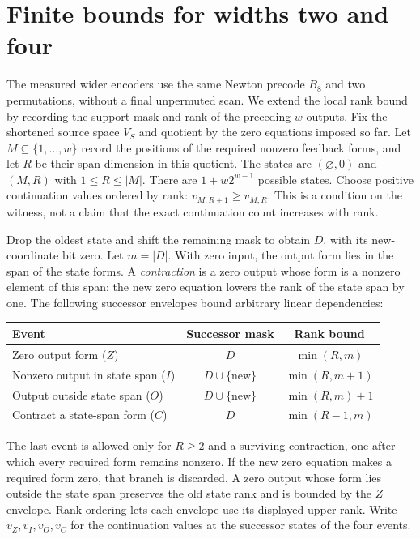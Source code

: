 \section{Finite bounds for widths two and four}\label{app:wide-mask}

The measured wider encoders use the same Newton precode $B_8$ and two
permutations, without a final unpermuted scan. We extend the local rank
bound by recording the support mask and rank of the preceding $w$ outputs.
Fix the shortened source space $V_S$ and quotient by the zero equations
imposed so far. Let $M\subseteq\{1,\ldots,w\}$ record the positions of the
required nonzero feedback forms, and let $R$ be their span dimension in
this quotient. The states are $(\varnothing,0)$ and
$(M,R)$ with $1\le R\le|M|$. There are $1+w2^{w-1}$ possible states.
Choose positive continuation values ordered by rank:
$v_{M,R+1}\ge v_{M,R}$. This is a condition on the witness, not a claim
that the exact continuation count increases with rank.

Drop the oldest state and shift the remaining mask to obtain $D$, with
its new-coordinate bit zero. Let $m=|D|$. With zero input, the output
form lies in the span of the state forms. A \emph{contraction} is a
zero output whose form is a nonzero element of this span: the new zero
equation lowers the rank of the state span by one. The following
successor envelopes bound arbitrary linear dependencies:
\begin{center}
\begin{tabular}{lcc}
\toprule
Event & Successor mask & Rank bound\\
\midrule
Zero output form ($Z$) & $D$ & $\min(R,m)$\\
Nonzero output in state span ($I$) & $D\cup\{\mathrm{new}\}$ & $\min(R,m+1)$\\
Output outside state span ($O$) & $D\cup\{\mathrm{new}\}$ & $\min(R,m)+1$\\
Contract a state-span form ($C$) & $D$ & $\min(R-1,m)$\\
\bottomrule
\end{tabular}
\end{center}
The last event is allowed only for $R\ge2$ and a surviving contraction,
one after which every required form remains nonzero. If the new zero
equation makes a required form zero, that branch is discarded. A zero
output whose form lies outside the state span preserves the old state
rank and is bounded by the $Z$ envelope. Rank ordering lets each
envelope use its displayed upper rank. Write $v_Z,v_I,v_O,v_C$ for the
continuation values at the successor states of the four events.


